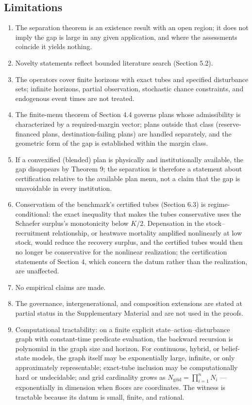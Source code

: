 \documentclass[3p,11pt]{elsarticle}
\providecommand{\tightlist}{\setlength{\itemsep}{0pt}\setlength{\parskip}{0pt}}
\begin{document}
\subsection{Limitations}\label{limitations}

\begin{enumerate}
\def\labelenumi{(\roman{enumi})}
\tightlist
\item
  The separation theorem is an existence result with an open region; it does not imply the gap is large in any given application, and where the assessments coincide it yields nothing.
\item
  Novelty statements reflect bounded literature search (Section 5.2).
\item
  The operators cover finite horizons with exact tubes and specified disturbance sets; infinite horizons, partial observation, stochastic chance constraints, and endogenous event times are not treated.
\item
  The finite-menu theorem of Section 4.4 governs plans whose admissibility is characterized by a required-margin vector; plans outside that class (reserve-financed plans, destination-failing plans) are handled separately, and the geometric form of the gap is established within the margin class.
\item
  If a convexified (blended) plan is physically and institutionally available, the gap disappears by Theorem 9; the separation is therefore a statement about certification relative to the available plan menu, not a claim that the gap is unavoidable in every institution.
\item
  Conservatism of the benchmark's certified tubes (Section 6.3) is
  regime-conditional: the exact inequality that makes the tubes
  conservative uses the Schaefer surplus's monotonicity below \(K/2\).
  Depensation in the stock--recruitment relationship, or heatwave
  mortality amplified nonlinearly at low stock, would reduce the recovery
  surplus, and the certified tubes would then no longer be conservative
  for the nonlinear realization; the certification statements of
  Section 4, which concern the datum rather than the realization, are
  unaffected.
\item
  No empirical claims are made.
\item
  The governance, intergenerational, and composition extensions are stated at partial status in the Supplementary Material and are not used in the proofs.
\item
  Computational tractability: on a finite explicit state--action--disturbance graph with constant-time predicate evaluation, the backward recursion is polynomial in the graph size and horizon. For continuous, hybrid, or belief-state models, the graph itself may be exponentially large, infinite, or only approximately representable; exact-tube inclusion may be computationally hard or undecidable; and grid cardinality grows as \(N_{\mathrm{grid}} = \prod_{i=1}^n N_i\) --- exponentially in dimension when floors are coordinates. The witness is tractable because its datum is small, finite, and rational.

\end{enumerate}
\end{document}

